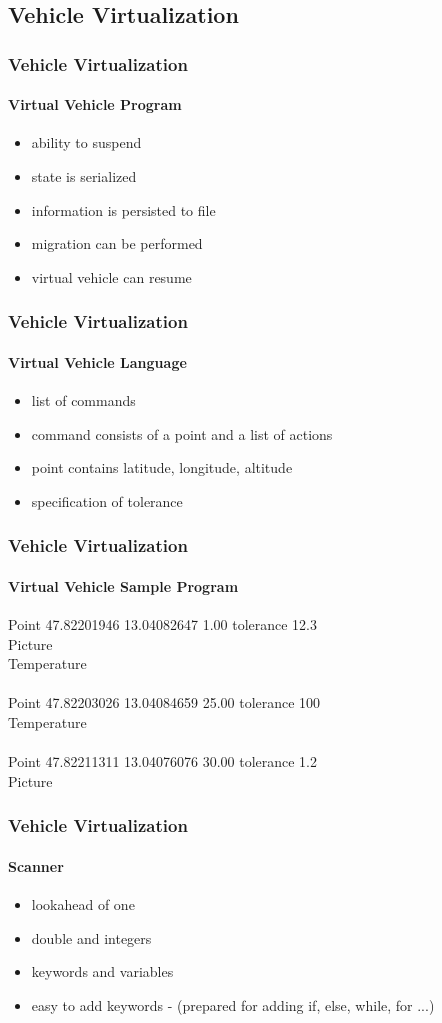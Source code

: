 \documentclass{beamer}
\begin{document}
\subsection{Vehicle Virtualization}

\begin{frame}\frametitle{Vehicle Virtualization}\framesubtitle{Virtual Vehicle Program}
\begin{itemize}
\item ability to suspend
\item state is serialized
\item information is persisted to file
\item migration can be performed
\item virtual vehicle can resume
\end{itemize} 
\end{frame}

\begin{frame}\frametitle{Vehicle Virtualization}\framesubtitle{Virtual Vehicle Language}
\begin{itemize}
\item list of commands
\item command consists of a point and a list of actions
\item point contains latitude, longitude, altitude
\item specification of tolerance
\end{itemize} 
\end{frame}

\begin{frame}\frametitle{Vehicle Virtualization}\framesubtitle{Virtual Vehicle Sample Program}
Point 47.82201946 13.04082647 1.00 tolerance 12.3\\
Picture \\
Temperature\\
\\
Point 47.82203026 13.04084659 25.00 tolerance 100 \\
Temperature\\
\\
Point 47.82211311 13.04076076 30.00 tolerance 1.2\\
Picture
\end{frame}

\begin{frame}\frametitle{Vehicle Virtualization}\framesubtitle{Scanner}
\begin{itemize}
\item lookahead of one
\item double and integers
\item keywords and variables
\item easy to add keywords - (prepared for adding if, else, while, for ...)
\end{itemize} 
\end{frame}
\end{document}
